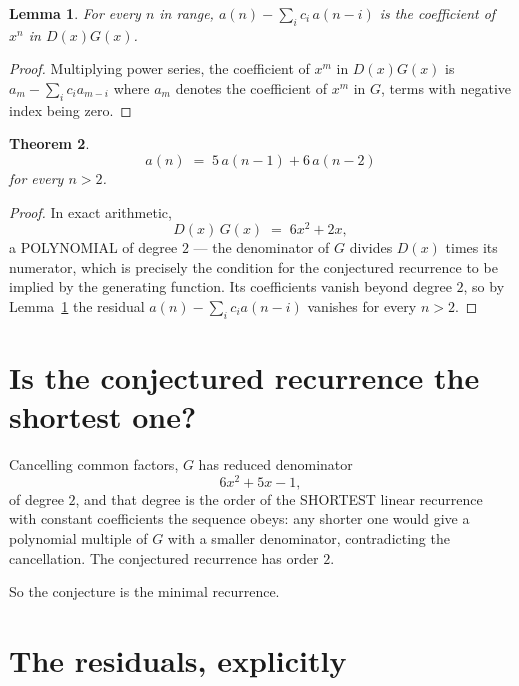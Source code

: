 \documentclass[11pt,a4paper]{article}
\theoremstyle{plain}
\newtheorem{theorem}{Theorem}
\newtheorem{lemma}[theorem]{Lemma}
\theoremstyle{definition}
\begin{document}
\begin{lemma}\label{lem:key}
For every $n$ in range, $a(n)-\sum_i c_i\,a(n-i)$ is the coefficient of $x^{n}$ in
$D(x)G(x)$.
\end{lemma}

\begin{proof}
Multiplying power series, the coefficient of $x^{m}$ in $D(x)G(x)$ is
$a_m-\sum_i c_i a_{m-i}$ where $a_m$ denotes the coefficient of $x^{m}$ in $G$, terms with
negative index being zero.
\end{proof}

\begin{theorem}
\[
a(n)\;=\;5\,a(n-1) + 6\,a(n-2)
\]
for every $n>2$.
\end{theorem}

\begin{proof}
In exact arithmetic,
\[
D(x)\,G(x)\;=\;6 x^{2} + 2 x,
\]
a POLYNOMIAL of degree $2$ --- the denominator of $G$ divides $D(x)$ times its numerator,
which is precisely the condition for the conjectured recurrence to be implied by the
generating function. Its coefficients vanish beyond degree $2$, so by
Lemma~\ref{lem:key} the residual $a(n)-\sum_ic_ia(n-i)$ vanishes for every
$n>2$.
\end{proof}

\section{Is the conjectured recurrence the shortest one?}

Cancelling common factors, $G$ has reduced denominator
\[
6 x^{2} + 5 x - 1,
\]
of degree $2$, and that degree is the order of the SHORTEST linear recurrence with
constant coefficients the sequence obeys: any shorter one would give a polynomial multiple of
$G$ with a smaller denominator, contradicting the cancellation. The conjectured recurrence has
order $2$.

So the conjecture is the minimal recurrence.

\section{The residuals, explicitly}
\end{document}
